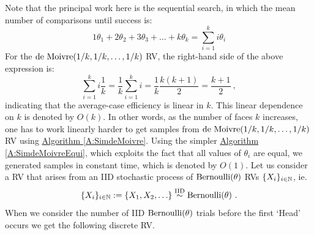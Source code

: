 Note that the principal work here is the sequential search, in which the mean number of comparisons until success is:
\[
1 \theta_1 + 2 \theta_2 + 3 \theta_3 + \ldots + k \theta_k = \sum_{i=1}^k{ i \theta_i}
\]
For the $\mbox{{\rm de~Moivre}}(1/k,1/k,\ldots,1/k)$ RV, the right-hand side of the above expression is:
\[
\sum_{i=1}^k{ i \frac{1}{k}} = \frac{1}{k} \sum_{i=1}^k{ i} = \frac{1}{k} \frac{k(k+1)}{2} = \frac{k+1}{2} \ ,
\]
indicating that the average-case efficiency is linear in $k$.  This linear dependence on $k$ is denoted by $O(k)$.  In other words, as the number of faces $k$ increases, one has to work linearly harder to get samples from $\mbox{{\rm de~Moivre}}(1/k,1/k,\ldots,1/k)$ RV using \hyperref[A:SimdeMoivre]{Algorithm \ref*{A:SimdeMoivre}}.  Using the simpler \hyperref[A:SimdeMoivreEqui]{Algorithm \ref*{A:SimdeMoivreEqui}}, which exploits the fact that all values of $\theta_i$  are equal, we generated samples in constant time, which is denoted by $O(1)$.
Let us consider a RV that arises from an IID stochastic process of $\mbox{{\rm Bernoulli}}(\theta)$ RVs $\{X_i\}_{i \in \mathbb{N}}$, ie.~
\[
 \{X_i\}_{i \in \mathbb{N}} := \{X_1, X_2,\ldots\}  \overset{{\rm IID}}{\sim} \mbox{{\rm Bernoulli}}(\theta) \ .
\]
When we consider the number of IID $\mbox{{\rm Bernoulli}}(\theta)$ trials before the first `Head' occurs we get the following discrete RV.
